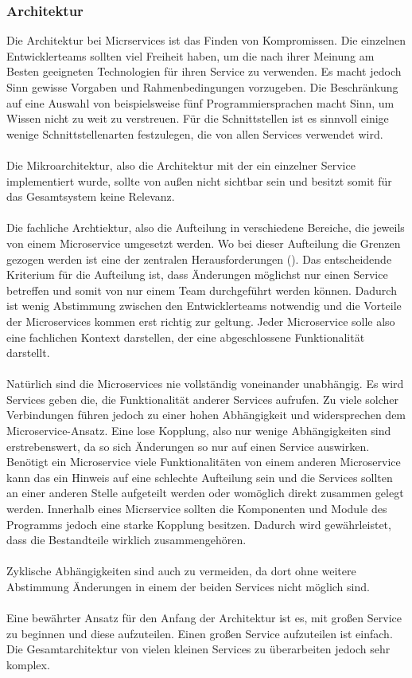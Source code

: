 \subsubsection{Architektur}

Die Architektur bei Micrservices ist das Finden von Kompromissen. Die einzelnen Entwicklerteams sollten viel Freiheit haben, um die nach ihrer Meinung am Besten geeigneten Technologien für ihren Service zu verwenden. Es macht jedoch Sinn gewisse Vorgaben und Rahmenbedingungen vorzugeben. Die Beschränkung auf eine Auswahl von beispielsweise fünf Programmiersprachen macht Sinn, um Wissen nicht zu weit zu verstreuen. Für die Schnittstellen ist es sinnvoll einige wenige Schnittstellenarten festzulegen, die von allen Services verwendet wird.  \\
\\
Die Mikroarchitektur, also die Architektur mit der ein einzelner Service implementiert wurde, sollte von außen nicht sichtbar sein und besitzt somit für das Gesamtsystem keine Relevanz. \\
\\
Die fachliche Archtiektur, also die Aufteilung in verschiedene Bereiche, die jeweils von einem Microservice umgesetzt werden. Wo bei dieser Aufteilung die Grenzen gezogen werden ist eine der zentralen Herausforderungen (\cite[S. 102]{wolffMicroservices2018}). Das entscheidende Kriterium für die Aufteilung ist, dass Änderungen möglichst nur einen Service betreffen und somit von nur einem Team durchgeführt werden können. Dadurch ist wenig Abstimmung zwischen den Entwicklerteams notwendig und die Vorteile der Microservices kommen erst richtig zur geltung. Jeder Microservice solle also eine fachlichen Kontext darstellen, der eine abgeschlossene Funktionalität darstellt. \\
\\
Natürlich sind die Microservices nie vollständig voneinander unabhängig. Es wird Services geben die, die Funktionalität anderer Services aufrufen. Zu viele solcher Verbindungen führen jedoch zu einer hohen Abhängigkeit und widersprechen dem Microservice-Ansatz. Eine lose Kopplung, also nur wenige Abhängigkeiten sind erstrebenswert, da so sich Änderungen so nur auf einen Service auswirken. Benötigt ein Microservice viele Funktionalitäten von einem anderen Microservice kann das ein Hinweis auf eine schlechte Aufteilung sein und die Services sollten an einer anderen Stelle aufgeteilt werden oder womöglich direkt zusammen gelegt werden. Innerhalb eines Micrservice sollten die Komponenten und Module des Programms jedoch eine starke Kopplung besitzen. Dadurch wird gewährleistet, dass die Bestandteile wirklich zusammengehören. \\
\\
Zyklische Abhängigkeiten sind auch zu vermeiden, da dort ohne weitere Abstimmung Änderungen in einem der beiden Services nicht möglich sind. \\
\\
Eine bewährter Ansatz für den Anfang der Architektur ist es, mit großen Service zu beginnen und diese aufzuteilen. Einen großen Service aufzuteilen ist einfach. Die Gesamtarchitektur von vielen kleinen Services zu überarbeiten jedoch sehr komplex. \\

